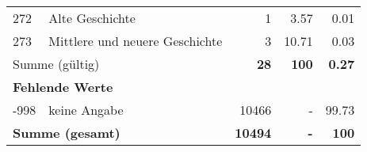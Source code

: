 \begin{longtable}{lXrrr}
     272 &
     \multicolumn{1}{X}{ Alte Geschichte   } &


       \num{1} &
       \num[round-mode=places,round-precision=2]{3,57} &
         \num[round-mode=places,round-precision=2]{0,01} \\

     273 &
     \multicolumn{1}{X}{ Mittlere und neuere Geschichte   } &


       \num{3} &
       \num[round-mode=places,round-precision=2]{10,71} &
         \num[round-mode=places,round-precision=2]{0,03} \\
     \midrule
     \multicolumn{2}{l}{Summe (gültig)} &
       \textbf{\num{28}} &
     \textbf{100} &
       \textbf{\num[round-mode=places,round-precision=2]{0,27}} \\
     \multicolumn{5}{l}{\textbf{Fehlende Werte}}\\
       -998 &
       keine Angabe &
         \num{10466} &
        - &
         \num[round-mode=places,round-precision=2]{99,73} \\
     \midrule
     \multicolumn{2}{l}{\textbf{Summe (gesamt)}} &
          \textbf{\num{10494}} &
        \textbf{-} &
        \textbf{100} \\
     \bottomrule
     \end{longtable}
     
